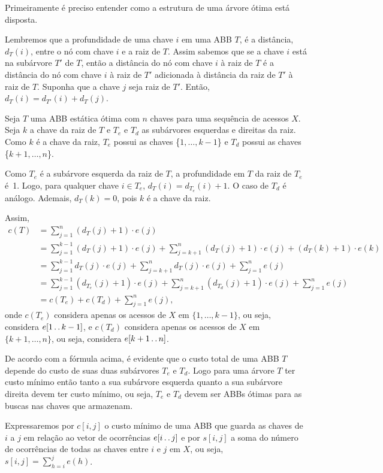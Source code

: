 Primeiramente é preciso entender como a estrutura de uma árvore ótima está disposta.

Lembremos que a profundidade de uma chave $i$ em uma ABB $T$, é a distância, $d_T(i)$, entre o nó com chave $i$ e a raiz de $T$. Assim sabemos que se a chave $i$ está na subárvore $T'$ de $T$, então a distância do nó com chave $i$ à raiz de $T$ é a distância do nó com chave $i$ à raiz de $T'$ adicionada à distância da raiz de $T'$ à raiz de $T$. Suponha que a chave $j$ seja raiz de $T'$. Então, $d_T(i) = d_{T'}(i) + d_{T}(j)$.

Seja $T$ uma ABB estática ótima com $n$ chaves para uma sequência de acessos $X$. Seja $k$ a chave da raiz de $T$ e $T_e$ e $T_d$ as subárvores esquerdas e direitas da raiz. Como $k$ é a chave da raiz, $T_e$ possui as chaves \{$1,\ldots,k-1$\} e $T_d$ possui as chaves \{$k+1,\ldots,n$\}. 

Como $T_e$ é a subárvore esquerda da raiz de $T$, a profundidade em $T$ da raiz de $T_e$ é~1. Logo, para qualquer chave $i \in T_e$, $d_T(i) = d_{T_{e}}(i) + 1$. O caso de $T_d$ é análogo. Ademais, $d_T(k) = 0$, pois $k$ é a chave da raiz.

Assim,
\begin{align*}
  c(T) &= \sum_{j=1}^{n}(d_T(j) + 1)\cdot e(j) \\
  &= \sum_{j=1}^{k-1}(d_T(j) + 1) \cdot e(j) + \sum_{j=k+1}^{n}(d_T(j) + 1)\cdot e(j) + (d_T(k) + 1)\cdot e(k) \\
  &= \sum_{j=1}^{k-1}d_T(j) \cdot e(j) + \sum_{j=k+1}^{n}d_T(j)\cdot e(j) + \sum_{j=1}^{n} e(j) \\
  &= \sum_{j=1}^{k-1}(d_{T_e}(j) + 1)\cdot e(j) + \sum_{j=k+1}^{n}(d_{T_d}(j) + 1)\cdot e(j) + \sum_{j=1}^{n} e(j) \\
  &= c(T_e) + c(T_d) + \sum_{j=1}^{n}e(j),
\end{align*}
onde $c(T_e)$ considera apenas os acessos de $X$ em $\{1,\ldots,k-1\}$, ou seja, considera $e[1 {\,.\,.\,} k-1]$, e $c(T_d)$ considera apenas os acessos de $X$ em $\{k+1,\ldots,n\}$, ou seja, considera $e[k+1 {\,.\,.\,} n]$.

De acordo com a fórmula acima, é evidente que o custo total de uma ABB $T$ depende do custo de suas duas subárvores $T_e$ e $T_d$. Logo para uma árvore $T$ ter custo mínimo então tanto a sua subárvore esquerda quanto a sua subárvore direita devem ter custo mínimo, ou seja, $T_e$ e $T_d$ devem ser ABBs ótimas para as buscas nas chaves que armazenam.

Expressaremos por $c[i,j]$ o custo mínimo de uma ABB que guarda as chaves de $i$ a $j$ em relação ao vetor de ocorrências $e[i {\,.\,.\,} j]$ e por $s[i,j]$ a soma do número de ocorrências de todas as chaves entre $i$ e $j$ em $X$, ou seja, $s[i,j] = \sum_{h=i}^{j} e(h)$.

